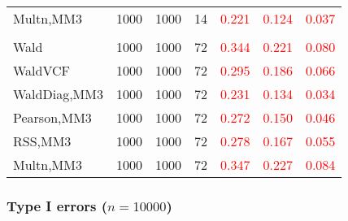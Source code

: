 \documentclass[
]{article}
\begin{document}
\begin{table}[H]
{\begin{tabular}[t]{lrrrrrr}
\hspace{1em}Multn,MM3 & 1000 & 1000 & 14 & \textcolor{red}{0.221} & \textcolor{red}{0.124} & \textcolor{red}{0.037}\\
\addlinespace[0.3em]
\multicolumn{7}{l}{\textbf{3F 15V}}\\
\hspace{1em}Wald & 1000 & 1000 & 72 & \textcolor{red}{0.344} & \textcolor{red}{0.221} & \textcolor{red}{0.080}\\
\hspace{1em}WaldVCF & 1000 & 1000 & 72 & \textcolor{red}{0.295} & \textcolor{red}{0.186} & \textcolor{red}{0.066}\\
\hspace{1em}WaldDiag,MM3 & 1000 & 1000 & 72 & \textcolor{red}{0.231} & \textcolor{red}{0.134} & \textcolor{red}{0.034}\\
\hspace{1em}Pearson,MM3 & 1000 & 1000 & 72 & \textcolor{red}{0.272} & \textcolor{red}{0.150} & \textcolor{red}{0.046}\\
\hspace{1em}RSS,MM3 & 1000 & 1000 & 72 & \textcolor{red}{0.278} & \textcolor{red}{0.167} & \textcolor{red}{0.055}\\
\hspace{1em}Multn,MM3 & 1000 & 1000 & 72 & \textcolor{red}{0.347} & \textcolor{red}{0.227} & \textcolor{red}{0.084}\\
\bottomrule
\end{tabular}}
\endgroup{}
\end{table}

\hypertarget{type-i-errors-n10000-1}{%
\subsubsection{\texorpdfstring{Type I errors
(\(n=10000\))}{Type I errors (n=10000)}}\label{type-i-errors-n10000-1}}
\end{document}
